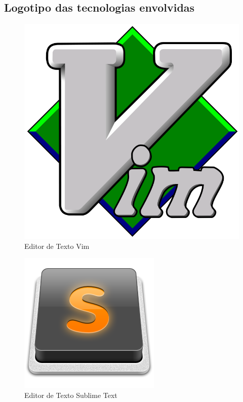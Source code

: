\documentclass[11pt]{article}
\begin{document}
\subsection{Logotipo das tecnologias envolvidas}
\begin{figure}[!htp]
\centering
\includegraphics[scale=0.75]{logo-vim.png}
\caption{Editor de Texto Vim}
\label{Vim logo}
\end{figure}

\begin{figure}[!htp]
\centering
\includegraphics[scale=0.75]{logo-sublime-text.png}
\caption{Editor de Texto Sublime Text}
\label{Sublime Text logo}
\end{figure}
\end{document}
